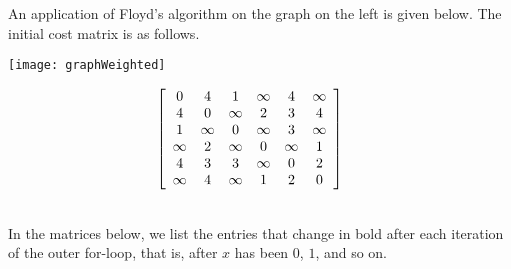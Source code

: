 \begin{Boxample}[0] \label{eg:floyd}
An application of Floyd's algorithm on the graph on the left is given below.
The initial cost matrix is as follows.

\begin{minipage}[c]{0.45\textwidth}
\centering
\texttt{[image: graphWeighted]}
\end{minipage}
\begin{minipage}[c]{0.45\textwidth}
\[ 
\left[
\begin{array}{cccccc} %
0        & 4        & 1        & \infty & 4        & \infty \\
4        & 0        & \infty & 2        & 3        & 4 \\
1        &  \infty  & 0        &  \infty  & 3        &  \infty  \\
 \infty  & 2        &  \infty  & 0        &  \infty  & 1 \\
4        & 3        & 3        &  \infty  & 0        & 2 \\
 \infty  & 4        &  \infty  & 1        & 2        & 0 \\
\end{array}
\right]
\hspace{.5cm}
\]
\end{minipage}\\

In the matrices below, we list the entries that change in bold after each iteration of the outer for-loop, 
that is, after $x$ has been $0$, $1$, and so on. 


\end{Boxample}
